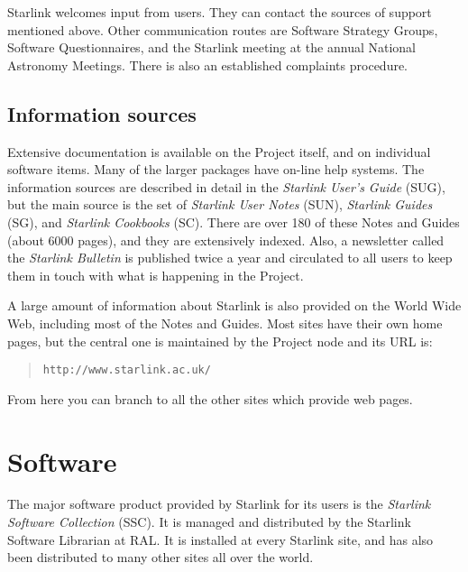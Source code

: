 \documentclass[twoside,11pt]{article}
\newcommand{\htmladdnormallink}[2]{#1}
\newcommand{\xref}[3]{#1}
\begin{document}
Starlink welcomes input from users.
They can contact the sources of support mentioned above.
Other communication routes are Software Strategy Groups, Software
Questionnaires, and the Starlink meeting at the annual National Astronomy
Meetings.
There is also an established complaints procedure.

\newpage

\subsection*{Information sources}

Extensive
\htmladdnormallink{documentation}{http://www.starlink.ac.uk/documentation.html}
is available on the Project itself, and on individual software items.
Many of the larger packages have on-line help systems.
The information sources are described in detail in the {\em Starlink User's
Guide} (\xref{SUG}{sug}{}), but the main source is the set of
{\em Starlink User Notes}\/ (\htmladdnormallink{SUN}{http://www.starlink.ac.uk/sun.html}),
{\em Starlink Guides}\/ (\htmladdnormallink{SG}{http://www.starlink.ac.uk/sg.html}),
and {\em Starlink Cookbooks}\/ (\htmladdnormallink{SC}{http://www.starlink.ac.uk/sc.html}).
There are over 180 of these Notes and Guides (about 6000 pages), and they
are extensively indexed.
Also, a newsletter called the
{\em \htmladdnormallink{Starlink Bulletin}
{http://www.starlink.ac.uk/bulletin.html}}
is published twice a year and circulated to all users to keep them in touch
with what is happening in the Project.

A large amount of information about Starlink is also provided on the World
Wide Web, including most of the Notes and Guides.
Most sites have their own home pages, but the central one is maintained
by the
\htmladdnormallink{Project node}{http://www.starlink.ac.uk/}
 and its URL is:
\begin{quote}
{\tt http://www.starlink.ac.uk/}
\end{quote}
From here you can branch to all the other sites which provide web pages.

\newpage

\section*{Software}

The major software product provided by Starlink for its users is the
{\em Starlink Software Collection}\/
(\htmladdnormallink{SSC}{http://www.starlink.ac.uk/software.html}).
It is managed and distributed by the Starlink Software Librarian at RAL.
It is installed at every Starlink site, and has also been distributed to
many other sites all over the world.
\end{document}
